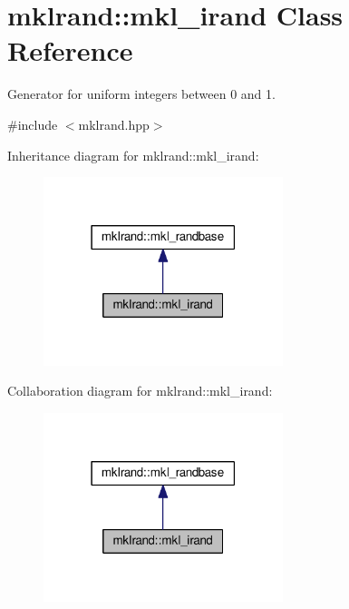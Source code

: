 \hypertarget{classmklrand_1_1mkl__irand}{}\section{mklrand\+:\+:mkl\+\_\+irand Class Reference}
\label{classmklrand_1_1mkl__irand}


Generator for uniform integers between 0 and 1.  




{\ttfamily \#include $<$mklrand.\+hpp$>$}



Inheritance diagram for mklrand\+:\+:mkl\+\_\+irand\+:\nopagebreak
\begin{figure}[H]
\begin{center}
\leavevmode
\includegraphics[width=198pt]{d0/d1e/classmklrand_1_1mkl__irand__inherit__graph}
\end{center}
\end{figure}


Collaboration diagram for mklrand\+:\+:mkl\+\_\+irand\+:\nopagebreak
\begin{figure}[H]
\begin{center}
\leavevmode
\includegraphics[width=198pt]{df/d22/classmklrand_1_1mkl__irand__coll__graph}
\end{center}
\end{figure}
